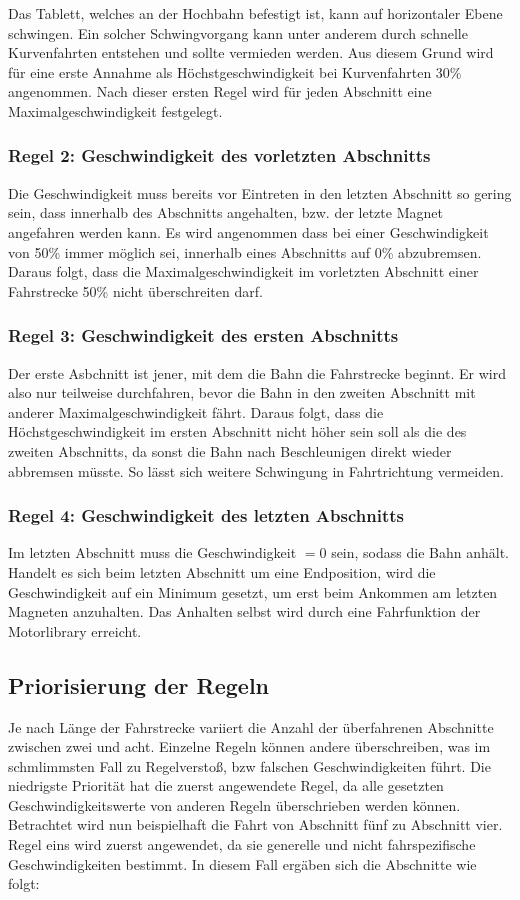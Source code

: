 Das Tablett, welches an der Hochbahn befestigt ist, kann auf horizontaler Ebene schwingen. Ein solcher Schwingvorgang kann unter anderem durch schnelle Kurvenfahrten entstehen und sollte vermieden werden. Aus diesem Grund wird für eine erste Annahme als Höchstgeschwindigkeit bei Kurvenfahrten 30\%  angenommen. Nach dieser ersten Regel wird für jeden Abschnitt eine Maximalgeschwindigkeit festgelegt.

\subsubsection{Regel 2: Geschwindigkeit des vorletzten Abschnitts}
Die Geschwindigkeit muss bereits vor Eintreten in den letzten Abschnitt so gering sein, dass innerhalb des Abschnitts angehalten, bzw. der letzte Magnet angefahren werden kann. Es wird angenommen dass bei einer Geschwindigkeit von 50\% immer möglich sei, innerhalb eines Abschnitts auf 0\% abzubremsen. Daraus folgt, dass die Maximalgeschwindigkeit im vorletzten Abschnitt einer Fahrstrecke 50\% nicht überschreiten darf. 

\subsubsection{Regel 3: Geschwindigkeit des ersten Abschnitts}
Der erste Asbchnitt ist jener, mit dem die Bahn die Fahrstrecke beginnt. Er wird also nur teilweise durchfahren, bevor die Bahn in den zweiten Abschnitt mit anderer Maximalgeschwindigkeit fährt. Daraus folgt, dass die Höchstgeschwindigkeit im ersten Abschnitt nicht höher sein soll als die des zweiten Abschnitts, da sonst die Bahn nach Beschleunigen direkt wieder abbremsen müsste. So lässt sich weitere Schwingung in Fahrtrichtung vermeiden.

\subsubsection{Regel 4: Geschwindigkeit des letzten Abschnitts}
Im letzten Abschnitt muss die Geschwindigkeit $= 0$ sein, sodass die Bahn anhält. Handelt es sich beim letzten Abschnitt um eine Endposition, wird die Geschwindigkeit auf ein Minimum gesetzt, um erst beim Ankommen am letzten Magneten anzuhalten. Das Anhalten selbst wird durch eine Fahrfunktion der Motorlibrary erreicht. 

\subsection{Priorisierung der Regeln}
Je nach Länge der Fahrstrecke variiert die Anzahl der überfahrenen Abschnitte zwischen zwei und acht. Einzelne Regeln können andere überschreiben, was im schmlimmsten Fall zu Regelverstoß, bzw falschen Geschwindigkeiten führt. Die niedrigste Priorität hat die zuerst angewendete Regel, da alle gesetzten Geschwindigkeitswerte von anderen Regeln überschrieben werden können.
\\
Betrachtet wird nun beispielhaft die Fahrt von Abschnitt fünf zu Abschnitt vier. Regel eins wird zuerst angewendet, da sie generelle und nicht fahrspezifische Geschwindigkeiten bestimmt. In diesem Fall ergäben sich die Abschnitte wie folgt:


